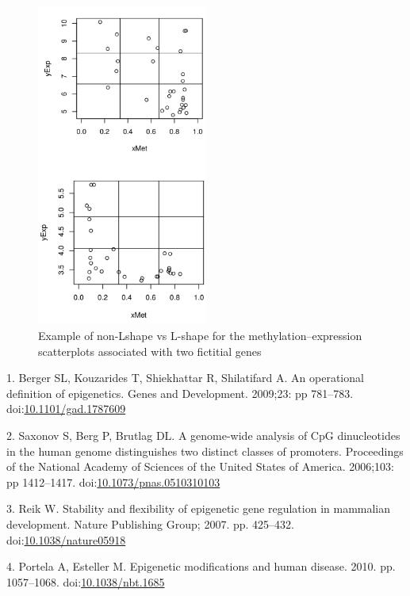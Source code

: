 \documentclass[10pt,letterpaper]{article}
\begin{document}
\begin{figure}
\hypertarget{id}{%
\centering
\includegraphics[width=0.5\textwidth,height=0.5\textheight]{figures/nonLshapeVSLshape1.png}
\caption{Example of non-Lshape vs L-shape for the
methylation--expression scatterplots associated with two fictitial
genes}\label{id}
}
\end{figure}

\hypertarget{refs}{}
\leavevmode\hypertarget{ref-Berger2009}{}%
1. Berger SL, Kouzarides T, Shiekhattar R, Shilatifard A. An operational
definition of epigenetics. Genes and Development. 2009;23: pp 781--783.
doi:\href{https://doi.org/10.1101/gad.1787609}{10.1101/gad.1787609}

\leavevmode\hypertarget{ref-Saxonov2006}{}%
2. Saxonov S, Berg P, Brutlag DL. A genome-wide analysis of CpG
dinucleotides in the human genome distinguishes two distinct classes of
promoters. Proceedings of the National Academy of Sciences of the United
States of America. 2006;103: pp 1412--1417.
doi:\href{https://doi.org/10.1073/pnas.0510310103}{10.1073/pnas.0510310103}

\leavevmode\hypertarget{ref-Reik2007}{}%
3. Reik W. Stability and flexibility of epigenetic gene regulation in
mammalian development. Nature Publishing Group; 2007. pp. 425--432.
doi:\href{https://doi.org/10.1038/nature05918}{10.1038/nature05918}

\leavevmode\hypertarget{ref-Portela2010}{}%
4. Portela A, Esteller M. Epigenetic modifications and human disease.
2010. pp. 1057--1068.
doi:\href{https://doi.org/10.1038/nbt.1685}{10.1038/nbt.1685}
\end{document}

